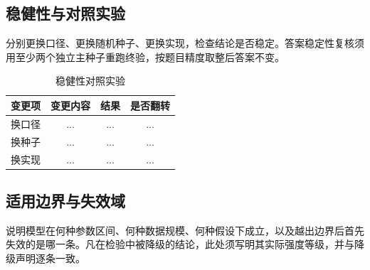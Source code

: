 
\subsection{稳健性与对照实验}

分别更换口径、更换随机种子、更换实现，检查结论是否稳定。答案稳定性复核须用至少两个独立主种子重跑终验，按题目精度取整后答案不变。

\begin{table}[H]
  \centering
  \caption{稳健性对照实验}
  \label{tab:robustness}
  \begin{tabularx}{\textwidth}{LCCC}
    \toprule
    变更项 & 变更内容 & 结果 & 是否翻转 \\
    \midrule
    换口径 & ... & ... & ... \\
    换种子 & ... & ... & ... \\
    换实现 & ... & ... & ... \\
    \bottomrule
  \end{tabularx}
\end{table}

\subsection{适用边界与失效域}

说明模型在何种参数区间、何种数据规模、何种假设下成立，以及越出边界后首先失效的是哪一条。凡在检验中被降级的结论，此处须写明其实际强度等级，并与降级声明逐条一致。
